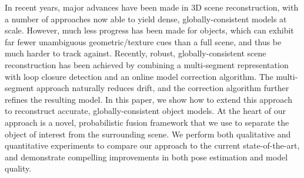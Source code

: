 \noindent In recent years, major advances have been made in 3D scene reconstruction, with a number of approaches now able to yield dense, globally-consistent models at scale. However, much less progress has been made for objects, which can exhibit far fewer unambiguous geometric/texture cues than a full scene, and thus be much harder to track against. Recently, robust, globally-consistent scene reconstruction has been achieved by combining a multi-segment representation with loop closure detection and an online model correction algorithm. The multi-segment approach naturally reduces drift, and the correction algorithm further refines the resulting model. In this paper, we show how to extend this approach to reconstruct accurate, globally-consistent object models. At the heart of our approach is a novel, probabilistic fusion framework that we use to separate the object of interest from the surrounding scene. We perform both qualitative and quantitative experiments to compare our approach to the current state-of-the-art, and demonstrate compelling improvements in both pose estimation and model quality.